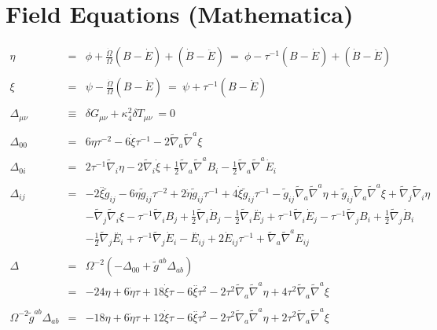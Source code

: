 \documentclass[10pt,letterpaper]{article}
\numberwithin{equation}{section}
\begin{document}
\section{Field Equations (Mathematica)}
\begin{eqnarray}
\eta &=& \phi+ \frac{\dot\Omega}{\Omega}(B-\dot E)+(\dot B-\ddot E)
\ =\  \phi-\tau^{-1}(B-\dot E)+(\dot B-\ddot E)
\\ \nonumber\\ 
\xi &=& \psi - \frac{\dot\Omega}{\Omega}(B-\dot E)
\ =\  \psi + \tau^{-1} (B-\dot E)
\\ \nonumber\\
\Delta_{\mu\nu} &\equiv& \delta G_{\mu\nu} +\kappa^2_4\delta T_{\mu\nu}\ =0
\\ \nonumber\\
\Delta_{00} &=& 6 \eta \tau^{-2} - 6 \dot{\xi} \tau^{-1} - 2 \tilde\nabla_{a}\tilde\nabla^{a}\xi 
\\ \nonumber\\
\Delta_{0i} &=& 2 \tau^{-1} \tilde\nabla_{i}\eta - 2 \tilde\nabla_{i}\dot{\xi}+\tfrac{1}{2} \tilde\nabla_{a}\tilde\nabla^{a}B_{i} -  \tfrac{1}{2} \tilde\nabla_{a}\tilde\nabla^{a}\dot{E}_{i}
\\ \nonumber\\
\Delta_{ij} &=&-2 \overset{..}{\xi} \tilde g_{ij}
- 6 \eta \tilde g_{ij} \tau^{-2}
+ 2 \dot{\eta} \tilde g_{ij} \tau^{-1}
+ 4 \dot{\xi} \tilde g_{ij} \tau^{-1}
-  \tilde g_{ij} \tilde\nabla_{a}\tilde\nabla^{a}\eta
+ \tilde g_{ij} \tilde\nabla_{a}\tilde\nabla^{a}\xi
+ \tilde\nabla_{j}\tilde\nabla_{i}\eta\nonumber\\
&& -  \tilde\nabla_{j}\tilde\nabla_{i}\xi - \tau^{-1} \tilde\nabla_{i}B_{j}
+ \tfrac{1}{2} \tilde\nabla_{i}\dot{B}_{j}
-  \tfrac{1}{2} \tilde\nabla_{i}\overset{..}{E}_{j}
+ \tau^{-1} \tilde\nabla_{i}\dot{E}_{j}
-  \tau^{-1} \tilde\nabla_{j}B_{i}
+ \tfrac{1}{2} \tilde\nabla_{j}\dot{B}_{i}
\nonumber\\
&&-  \tfrac{1}{2} \tilde\nabla_{j}\overset{..}{E}_{i} + \tau^{-1} \tilde\nabla_{j}\dot{E}_{i}
- \overset{..}{E}_{ij}
+ 2 \dot{E}_{ij} \tau^{-1}
+ \tilde\nabla_{a}\tilde\nabla^{a}E_{ij}
\\ \nonumber\\
\Delta &=& \Omega^{-2}(-\Delta_{00} + \tilde g^{ab}\Delta_{ab})
\nonumber\\
&=&-24 \eta + 6 \dot{\eta} \tau + 18 \dot{\xi} \tau - 6 \overset{..}{\xi} \tau^2 - 2 \tau^2 \tilde{\nabla}_{a}\tilde{\nabla}^{a}\eta + 4 \tau^2 \tilde{\nabla}_{a}\tilde{\nabla}^{a}\xi 
\\ \nonumber\\
\Omega^{-2}\tilde g^{ab}\Delta_{ab} &=& 
-18 \eta + 6 \dot{\eta} \tau + 12 \dot{\xi} \tau - 6 \overset{..}{\xi} \tau^2 - 2 \tau^2 \tilde{\nabla}_{a}\tilde{\nabla}^{a}\eta + 2 \tau^2 \tilde{\nabla}_{a}\tilde{\nabla}^{a}\xi 
\end{eqnarray}
%
\end{document}
